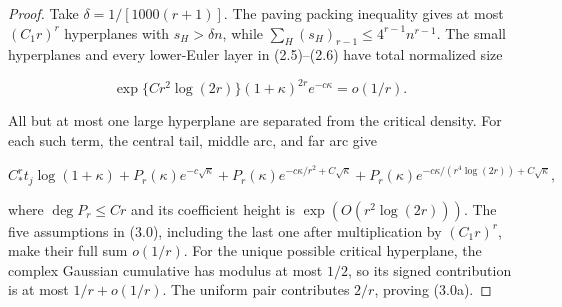 \documentclass[10pt]{article}
\begin{document}
\begin{proof}


Take $\delta=1/[1000(r+1)]$.  The paving packing inequality gives at most
$(C_1r)^r$ hyperplanes with $s_H>\delta n$, while
$\sum_H(s_H)_{r-1}\le4^{r-1}n^{r-1}$.  The small hyperplanes and every
lower-Euler layer in (2.5)--(2.6) have total normalized size

\[
 \exp\{C r^2\log(2r)\}(1+\kappa)^{2r}e^{-c\kappa}=o(1/r). \tag{3.0b}
\]

All but at most one large hyperplane are separated from the critical density.
For each such term, the central tail, middle arc, and far arc give

\[
 C_*^rt_j\log(1+\kappa)
 +P_r(\kappa)e^{-c\sqrt\kappa}
 +P_r(\kappa)e^{-c\kappa/r^2+C\sqrt\kappa}
 +P_r(\kappa)e^{-c\kappa/(r^4\log(2r))+C\sqrt\kappa}, \tag{3.0c}
\]

where $\deg P_r\le Cr$ and its coefficient height is
$\exp(O(r^2\log(2r)))$.  The five assumptions in (3.0), including the last
one after multiplication by $(C_1r)^r$, make their full sum $o(1/r)$.
For the unique possible critical hyperplane, the complex Gaussian cumulative
has modulus at most $1/2$, so its signed contribution is at most
$1/r+o(1/r)$.  The uniform pair contributes $2/r$, proving (3.0a).

\end{proof}
\end{document}
